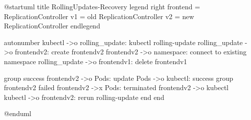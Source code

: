 @startuml
title RollingUpdates-Recovery
legend right
  frontend = ReplicationController
  v1 = old ReplicationController
  v2 = new ReplicationController
endlegend

autonumber
kubectl ->o rolling_update: kubectl rolling-update
rolling_update ->o frontendv2: create frontendv2
frontendv2 ->o namespace: connect to existing namespace
rolling_update ->o frontendv1: delete frontendv1

group success
  frontendv2 ->o Pods: update
  Pods ->o kubectl: success
  group frontendv2 failed
    frontendv2 ->x Pods: terminated
    frontendv2 ->o kubectl
    kubectl ->o frontendv2: rerun rolling-update
    end
end

@enduml
